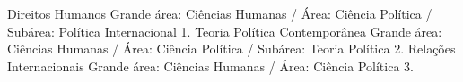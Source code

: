 \begin{cvhonors}
  \cvhonor
    {Direitos Humanos}
    {Grande área: Ciências Humanas / Área: Ciência Política / Subárea: Política Internacional}
    {}
    {1. }
  \cvhonor
    {Teoria Política Contemporânea}
    {Grande área: Ciências Humanas / Área: Ciência Política / Subárea: Teoria Política}
    {}
    {2.}
  \cvhonor
    {Relações Internacionais}
    {Grande área: Ciências Humanas / Área: Ciência Política}
    {}
    {3.}
\end{cvhonors}
